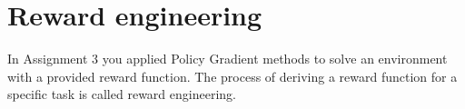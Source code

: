 \section{Reward engineering}

In Assignment 3 you applied Policy Gradient methods to solve an environment with a provided reward function. The process of deriving a reward function for a specific task is called reward engineering.

\begin{enumerate}[(a)]

	

	

	

	

	

	

	

\end{enumerate}

\clearpage
